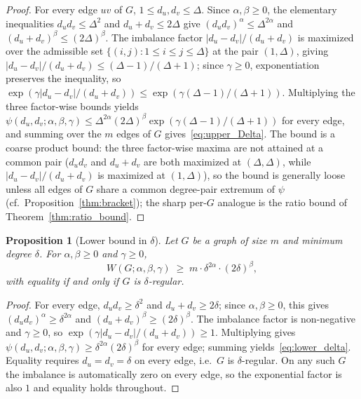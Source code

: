 \documentclass[11pt,a4paper]{article}
\newtheorem{proposition}[theorem]{Proposition}
\theoremstyle{definition}
\newcommand{\Wuzi}{W(G;\alpha,\beta,\gamma)}
\begin{document}
\begin{proof}
For every edge $uv$ of $G$, $1 \le d_u, d_v \le \Delta$. Since
$\alpha, \beta \ge 0$, the elementary inequalities
$d_u d_v \le \Delta^2$ and $d_u + d_v \le 2\Delta$ give
$(d_u d_v)^{\alpha} \le \Delta^{2\alpha}$ and
$(d_u + d_v)^{\beta} \le (2\Delta)^{\beta}$. The imbalance
factor $|d_u - d_v| / (d_u + d_v)$ is maximized over the admissible
set $\{(i, j) : 1 \le i \le j \le \Delta\}$ at the pair $(1, \Delta)$,
giving $|d_u - d_v| / (d_u + d_v) \le (\Delta - 1) / (\Delta + 1)$;
since $\gamma \ge 0$, exponentiation preserves the inequality, so
$\exp(\gamma |d_u - d_v| / (d_u + d_v))
   \le \exp(\gamma (\Delta - 1) / (\Delta + 1))$.
Multiplying the three factor-wise bounds yields
$\psi(d_u, d_v; \alpha, \beta, \gamma)
   \le \Delta^{2\alpha} (2\Delta)^{\beta} \exp(\gamma (\Delta - 1) / (\Delta + 1))$
for every edge, and summing over the $m$ edges of $G$
gives~\eqref{eq:upper_Delta}. The bound is a coarse product bound:
the three factor-wise maxima are not attained at a common pair
($d_u d_v$ and $d_u + d_v$ are both maximized at $(\Delta, \Delta)$,
while $|d_u - d_v|/(d_u + d_v)$ is maximized at $(1, \Delta)$), so
the bound is generally loose unless all edges of $G$ share a
common degree-pair extremum of $\psi$ (cf.\
Proposition~\ref{thm:bracket}); the sharp per-$G$ analogue is the
ratio bound of Theorem~\ref{thm:ratio_bound}.
\end{proof}

\begin{proposition}[Lower bound in $\delta$]\label{thm:lower_delta}
Let $G$ be a graph of size $m$ and minimum degree $\delta$. For
$\alpha, \beta \ge 0$ and $\gamma \ge 0$,
\begin{equation}\label{eq:lower_delta}
\Wuzi \;\ge\; m \cdot \delta^{2\alpha} \cdot (2\delta)^{\beta},
\end{equation}
with equality if and only if $G$ is $\delta$-regular.
\end{proposition}

\begin{proof}
For every edge, $d_u d_v \ge \delta^2$ and $d_u + d_v \ge 2\delta$;
since $\alpha, \beta \ge 0$, this gives
$(d_u d_v)^{\alpha} \ge \delta^{2\alpha}$ and
$(d_u + d_v)^{\beta} \ge (2\delta)^{\beta}$. The imbalance factor
is non-negative and $\gamma \ge 0$, so
$\exp(\gamma |d_u - d_v| / (d_u + d_v)) \ge 1$. Multiplying gives
$\psi(d_u, d_v; \alpha, \beta, \gamma) \ge \delta^{2\alpha}(2\delta)^{\beta}$
for every edge; summing yields~\eqref{eq:lower_delta}. Equality
requires $d_u = d_v = \delta$ on every edge, i.e.\ $G$ is
$\delta$-regular. On any such $G$ the imbalance is automatically
zero on every edge, so the exponential factor is also $1$ and
equality holds throughout.
\end{proof}
\end{document}
